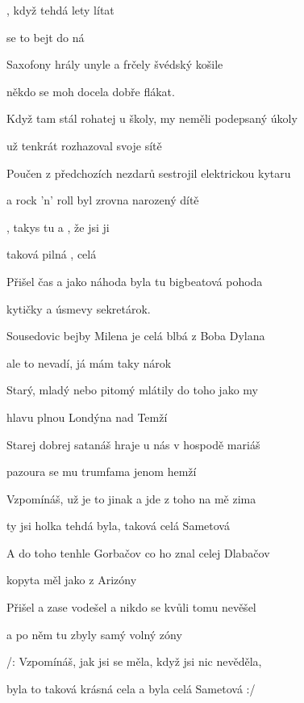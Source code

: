 

\zs
{}, když tehdá  lety
 lítat 

 se to bejt  do ná
\ks

\zs
Saxofony hrály unyle a frčely švédský košile

někdo se moh docela dobře flákat.
\ks

\zs
Když tam stál rohatej u školy, my neměli podepsaný úkoly

už tenkrát rozhazoval svoje sítě
\ks

\zs
Poučen z předchozích nezdarů sestrojil elektrickou kytaru

a rock 'n' roll byl zrovna narozený dítě
\ks

\zr
{}, takys tu  a , že jsi ji

taková  pilná ,  celá    
\kr

\zs
Přišel čas a jako náhoda byla tu bigbeatová pohoda

kytičky a úsmevy sekretárok.
\ks

\zs
Sousedovic bejby Milena je celá blbá z Boba Dylana

ale to nevadí, já mám taky nárok
\ks

\zs
Starý, mladý nebo pitomý mlátily do toho jako my

hlavu plnou Londýna nad Temží
\ks

\zs
Starej dobrej satanáš hraje u nás v hospodě mariáš

pazoura se mu trumfama jenom hemží
\ks

\zr
Vzpomínáš, už je to jinak a jde z toho na mě zima

ty jsi holka tehdá byla, taková celá Sametová
\kr

\zs
A do toho tenhle Gorbačov co ho znal celej Dlabačov

kopyta měl jako z Arizóny
\ks

\zs
Přišel a zase vodešel a nikdo se kvůli tomu nevěšel

a po něm tu zbyly samý volný zóny
\ks

\zr
/: Vzpomínáš, jak jsi se měla,
když jsi nic nevěděla,

byla to taková krásná cela a byla celá Sametová :/
\kr

